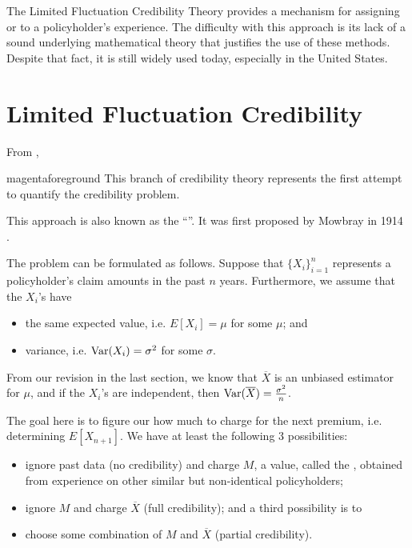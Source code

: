 \documentclass[notoc,notitlepage]{tufte-book}
\begin{document}
The Limited Fluctuation Credibility Theory provides a mechanism for assigning
 or  to a policyholder's experience.
The difficulty with this approach is its lack of a sound underlying mathematical
theory that justifies the use of these methods. Despite that fact, it is still
widely used today, especially in the United States.

\section{Limited Fluctuation Credibility}%
\label{sec:limited_fluctuation_credibility}

From \citealt{klugman2012},
\begin{quotebox}{magenta}{foreground}
  This branch of credibility theory represents the first attempt to quantify the
  credibility problem.
\end{quotebox}
This approach is also known as the ``''. It was
first proposed by Mowbray in 1914 \cite{mowbray1914}.

The problem can be formulated as follows. Suppose that $\{ X_i \}_{i=1}^n$
represents a policyholder's claim amounts in the past $n$ years. Furthermore, we
assume that the $X_i$'s have
\begin{itemize}
  \item the same expected value, i.e. $E[X_i] = \mu$ for some $\mu$; and
  \item variance, i.e. $\operatorname{Var}(X_i) = \sigma^2$ for some $\sigma$.
\end{itemize}
From our revision in the last section, we know that $\overline{X}$ is an
unbiased estimator for $\mu$, and if the $X_i$'s are independent, then
$\operatorname{Var}(\overline{X}) = \frac{\sigma^2}{n}$.

The goal here is to figure our how much to charge for the next premium, i.e.
determining $E[X_{n+1}]$. We have at least the following 3 possibilities:
\begin{itemize}
  \item ignore past data (no credibility) and charge $M$, a value, called the
     , obtained from
    experience on other similar but non-identical policyholders;
  \item ignore $M$ and charge $\overline{X}$ (full credibility); and a third
    possibility is to
  \item choose some combination of $M$ and $\overline{X}$ (partial
    credibility).
\end{itemize}
\end{document}
